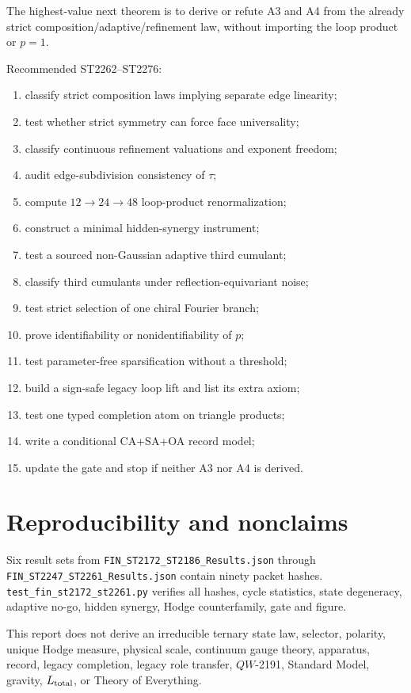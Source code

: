 \documentclass[11pt,a4paper]{article}
\begin{document}
The highest-value next theorem is to derive or refute A3 and A4 from the
already strict composition/adaptive/refinement law, without importing the loop
product or \(p=1\).

Recommended ST2262--ST2276:
\begin{enumerate}[label=\textbf{ST\arabic*}, start=2262]
\item classify strict composition laws implying separate edge linearity;
\item test whether strict symmetry can force face universality;
\item classify continuous refinement valuations and exponent freedom;
\item audit edge-subdivision consistency of \(\tau\);
\item compute \(12\to24\to48\) loop-product renormalization;
\item construct a minimal hidden-synergy instrument;
\item test a sourced non-Gaussian adaptive third cumulant;
\item classify third cumulants under reflection-equivariant noise;
\item test strict selection of one chiral Fourier branch;
\item prove identifiability or nonidentifiability of \(p\);
\item test parameter-free sparsification without a threshold;
\item build a sign-safe legacy loop lift and list its extra axiom;
\item test one typed completion atom on triangle products;
\item write a conditional CA+SA+OA record model;
\item update the gate and stop if neither A3 nor A4 is derived.
\end{enumerate}

\section{Reproducibility and nonclaims}

Six result sets from
\texttt{FIN\_ST2172\_ST2186\_Results.json} through
\texttt{FIN\_ST2247\_ST2261\_Results.json} contain ninety packet hashes.
\texttt{test\_fin\_st2172\_st2261.py} verifies all hashes, cycle statistics,
state degeneracy, adaptive no-go, hidden synergy, Hodge counterfamily, gate and
figure.

This report does not derive an irreducible ternary state law, selector,
polarity, unique Hodge measure, physical scale, continuum gauge theory,
apparatus, record, legacy completion, legacy role transfer, \(QW\)-2191,
Standard Model, gravity, \(L_{\rm total}\), or Theory of Everything.
\end{document}

